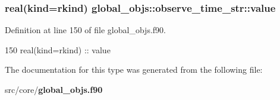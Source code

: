 \subsubsection[{value}]{\setlength{\rightskip}{0pt plus 5cm}real(kind=rkind) global\+\_\+objs\+::observe\+\_\+time\+\_\+str\+::value}\label{structglobal__objs_1_1observe__time__str_a7b7302dc2e20986e085160a618ea5e4f}


Definition at line 150 of file global\+\_\+objs.\+f90.


\begin{DoxyCode}
150     \textcolor{keywordtype}{real(kind=rkind)} :: value
\end{DoxyCode}


The documentation for this type was generated from the following file\+:\begin{DoxyCompactItemize}
\item 
src/core/{\bf global\+\_\+objs.\+f90}\end{DoxyCompactItemize}

